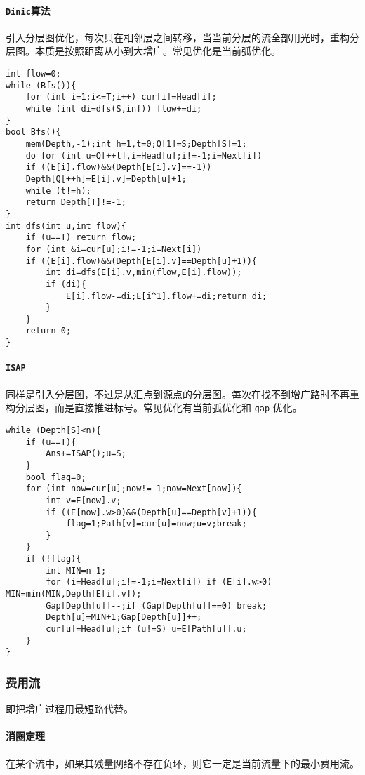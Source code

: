 \documentclass[UTF-8]{ctexart}
\begin{document}
	\paragraph{\texttt{Dinic}算法} 引入分层图优化，每次只在相邻层之间转移，当当前分层的流全部用光时，重构分层图。本质是按照距离从小到大增广。常见优化是当前弧优化。
\begin{verbatim}
int flow=0;
while (Bfs()){
    for (int i=1;i<=T;i++) cur[i]=Head[i];
    while (int di=dfs(S,inf)) flow+=di;
}
bool Bfs(){
    mem(Depth,-1);int h=1,t=0;Q[1]=S;Depth[S]=1;
    do for (int u=Q[++t],i=Head[u];i!=-1;i=Next[i])
    if ((E[i].flow)&&(Depth[E[i].v]==-1))
    Depth[Q[++h]=E[i].v]=Depth[u]+1;
    while (t!=h);
    return Depth[T]!=-1;
}
int dfs(int u,int flow){
    if (u==T) return flow;
    for (int &i=cur[u];i!=-1;i=Next[i])
    if ((E[i].flow)&&(Depth[E[i].v]==Depth[u]+1)){
        int di=dfs(E[i].v,min(flow,E[i].flow));
        if (di){
            E[i].flow-=di;E[i^1].flow+=di;return di;
        }
    }
    return 0;
}
\end{verbatim}
	\paragraph{\texttt{ISAP}} 同样是引入分层图，不过是从汇点到源点的分层图。每次在找不到增广路时不再重构分层图，而是直接推进标号。常见优化有当前弧优化和 \texttt{gap} 优化。
\begin{verbatim}
while (Depth[S]<n){
    if (u==T){
        Ans+=ISAP();u=S;
    }
    bool flag=0;
    for (int now=cur[u];now!=-1;now=Next[now]){
        int v=E[now].v;
        if ((E[now].w>0)&&(Depth[u]==Depth[v]+1)){
            flag=1;Path[v]=cur[u]=now;u=v;break;
        }
    }
    if (!flag){
        int MIN=n-1;
        for (i=Head[u];i!=-1;i=Next[i]) if (E[i].w>0) MIN=min(MIN,Depth[E[i].v]);
        Gap[Depth[u]]--;if (Gap[Depth[u]]==0) break;
        Depth[u]=MIN+1;Gap[Depth[u]]++;
        cur[u]=Head[u];if (u!=S) u=E[Path[u]].u;
    }
}
\end{verbatim}
	\subsubsection{费用流}
	即把增广过程用最短路代替。
	
	
	\paragraph{消圈定理} 在某个流中，如果其残量网络不存在负环，则它一定是当前流量下的最小费用流。
	
\end{document}
